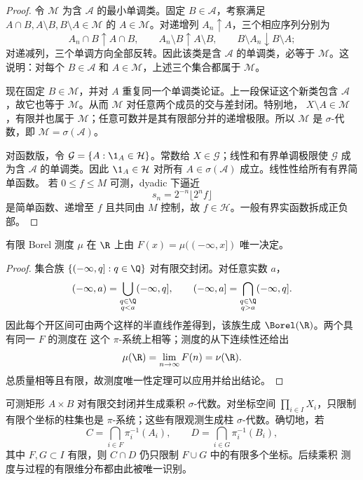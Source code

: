 \begin{proof}
令 $\mathcal M$ 为含 $\mathcal A$ 的最小单调类。固定 $B\in\mathcal A$，考察满足
$A\cap B,A\setminus B,B\setminus A\in\mathcal M$ 的 $A\in\mathcal M$。对递增列
$A_n\uparrow A$，三个相应序列分别为
\[
 A_n\cap B\uparrow A\cap B,\qquad
 A_n\setminus B\uparrow A\setminus B,\qquad
 B\setminus A_n\downarrow B\setminus A;
\]
对递减列，三个单调方向全部反转。因此该类是含 $\mathcal A$ 的单调类，必等于
$\mathcal M$。这说明：对每个 $B\in\mathcal A$ 和 $A\in\mathcal M$，上述三个集合都属于
$\mathcal M$。

现在固定 $B\in\mathcal M$，并对 $A$ 重复同一个单调类论证。上一段保证这个新类包含
$\mathcal A$，故它也等于 $\mathcal M$。从而 $\mathcal M$ 对任意两个成员的交与差封闭。特别地，
$X\setminus A\in\mathcal M$，有限并也属于 $\mathcal M$；任意可数并是其有限部分并的递增极限。所以
$\mathcal M$ 是 $\sigma$-代数，即 $\mathcal M=\sigma(\mathcal A)$。

对函数版，令 $\mathcal G=\{A:\1_A\in\mathcal H\}$。常数给
$X\in\mathcal G$；线性和有界单调极限使 $\mathcal G$ 成为含 $\mathcal A$ 的单调类。因此
$\1_A\in\mathcal H$ 对所有 $A\in\sigma(\mathcal A)$ 成立。线性性给所有有界简单函数。
若 $0\le f\le M$ 可测，dyadic 下逼近
\[
 s_n=2^{-n}\lfloor2^nf\rfloor
\]
是简单函数、递增至 $f$ 且共同由 $M$ 控制，故 $f\in\mathcal H$。一般有界实函数拆成正负部。
\end{proof}

\begin{proposition}[分布由半直线确定]\label{proposition:2-2-1-4}
有限 Borel 测度 $\mu$ 在 $\R$ 上由
$F(x)=\mu(( -\infty,x])$ 唯一决定。
\end{proposition}

\begin{proof}
集合族 $\{(-\infty,q]:q\in\Q\}$ 对有限交封闭。对任意实数 $a$，
\[
 (-\infty,a)=\bigcup_{\substack{q\in\Q\\q<a}}(-\infty,q],\qquad
 (-\infty,a]=\bigcap_{\substack{q\in\Q\\q>a}}(-\infty,q].
\]
因此每个开区间可由两个这样的半直线作差得到，该族生成 $\Borel(\R)$。两个具有同一 $F$ 的测度在
这个 $\pi$-系统上相等；测度的从下连续性还给出
\[
 \mu(\R)=\lim_{n\to\infty}F(n)=\nu(\R).
\]
总质量相等且有限，故测度唯一性定理可以应用并给出结论。
\end{proof}

\begin{example}[矩形与柱集]\label{ex:2-2-1-2}
可测矩形 $A\times B$ 对有限交封闭并生成乘积 $\sigma$-代数。对坐标空间
$\prod_{i\in I}X_i$，只限制有限个坐标的柱集也是 $\pi$-系统；这些有限观测生成柱
$\sigma$-代数。确切地，若
\[
 C=\bigcap_{i\in F}\pi_i^{-1}(A_i),\qquad
 D=\bigcap_{i\in G}\pi_i^{-1}(B_i),
\]
其中 \(F,G\subset I\) 有限，则 \(C\cap D\) 仍只限制 \(F\cup G\) 中的有限多个坐标。后续乘积
测度与过程的有限维分布都由此被唯一识别。
\end{example}

